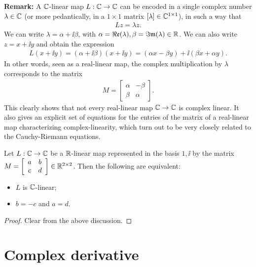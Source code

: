 \textbf{Remark:} A $\mathbb{C}$-linear map $L : \mathbb{C} \to \mathbb{C}$ can be encoded in a single complex number
$\lambda \in \mathbb{C}$ (or more pedantically, in a $1 \times 1$ matrix $[\lambda] \in \mathbb{C}^{1 \times 1}$),
in such a way that
\begin{align*}
  L z = \lambda z .
\end{align*}
We can write $\lambda = \alpha + \ii \beta$, with
$\alpha = \Re\mathfrak{e}(\lambda), \beta = \Im\mathfrak{m}(\lambda) \in \mathbb{R}$. We can also write $z = x + \ii y$
and obtain the expression
\begin{align*}
  L (x + \ii y) = (\alpha + \ii \beta) (x + \ii y)
    = (\alpha x - \beta y) + \ii (\beta x + \alpha y) .
\end{align*}
In other words, seen as a real-linear map, the complex multiplication by $\lambda$
corresponds to the matrix
\begin{align*}
  M = \left[ \begin{array}{cc} \alpha & -\beta \\ \beta & \alpha \end{array} \right] .
\end{align*}
This clearly shows that not every real-linear map $\mathbb{C} \to \mathbb{C}$ is complex linear.
It also gives an explicit set of equations for the entries of
the matrix of a real-linear map characterizing complex-linearity, which turn out to be
very closely related to the Cauchy-Riemann equations.

\begin{lemma}
  \label{lem:complex_linear_vs_real_linear}
  Let $L : \mathbb{C} \to \mathbb{C}$ be a $\mathbb{R}$-linear map represented in the basis $1,\ii$ by
  the matrix $M = \left[ \begin{array}{cc} a & b \\ c & d \end{array} \right] \in \mathbb{R}^{2 \times 2}$.
  Then the following are equivalent:
  \begin{itemize}
    \item $L$ is $\mathbb{C}$-linear;
    \item $b = - c$ and $a = d$.
  \end{itemize}
\end{lemma}
\begin{proof}
  Clear from the above discussion.
\end{proof}



\section{Complex derivative}

